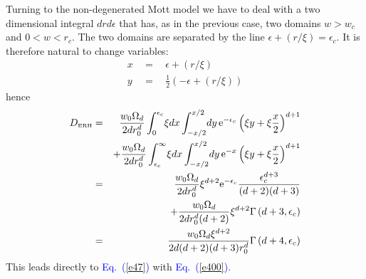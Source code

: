 \documentclass[aps,pre,floats,floatfix,twocolumn]{revtex4}
\newcommand{\eexp}{\mbox{e}^}
\newcommand{\tbox}[1]{\mbox{\tiny #1}}
\newcommand{\beq}{\begin{eqnarray}}
\newcommand{\eeq}{\end{eqnarray}}
\newcommand{\Eq}[1]{\textcolor{blue}{Eq.\!\!~(\ref{#1})}}
\begin{document}
Turning to the non-degenerated Mott model
we have to deal with a two dimensional integral $drd\epsilon$
that has, as in the previous case, two domains 
${w>w_c}$ and ${0<w<r_c}$. The two domains are 
separated by the line ${\epsilon+(r/\xi)=\epsilon_c}$.
It is therefore natural to change variables:
%
\beq
x\ \ &=& \ \ \epsilon+(r/\xi) \\
y\ \ &=& \ \ \frac{1}{2}\left(-\epsilon+(r/\xi)\right) 
\eeq
%
hence 
%
\beq
D_{\tbox{ERH}} &=& 
\frac{w_0\Omega_d}{2dr_0^d}\int_0^{\epsilon_c}\! \xi dx \int_{-x/2}^{x/2} \! dy \, \eexp{-\epsilon_c} \left(\xi y + \xi \frac{x}{2}\right)^{d+1} 
\nonumber \\
&& + \frac{w_0\Omega_d}{2dr_0^d}\int_{\epsilon_c}^{\infty} \! \xi dx \int_{-x/2}^{x/2} \! dy \, \eexp{-x} \left(\xi y+\xi \frac{x}{2}\right)^{d+1} 
\nonumber \\
&=& \frac{w_0\Omega_d}{2dr_0^d}\xi^{d+2} \eexp{-\epsilon_c} \frac{\epsilon_c^{d+3}}{(d+2)(d+3)}  
\nonumber \\
&& +\frac{w_0\Omega_d}{2dr_0^d(d+2)}\xi^{d+2} \Gamma\left(d+3,\epsilon_c\right)
\nonumber \\
&=& \frac{w_0\Omega_d \xi^{d+2}}{2d(d+2)(d+3)r_0^d}\Gamma\left(d+4,\epsilon_c\right)
\eeq
%
This leads directly to \Eq{e47} with \Eq{e400}.




\clearpage
\end{document}
